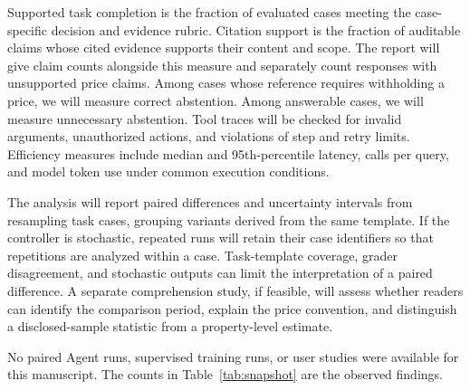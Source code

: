 Supported task completion is the fraction of evaluated cases meeting the case-specific decision and evidence rubric. Citation support is the fraction of auditable claims whose cited evidence supports their content and scope. The report will give claim counts alongside this measure and separately count responses with unsupported price claims. Among cases whose reference requires withholding a price, we will measure correct abstention. Among answerable cases, we will measure unnecessary abstention. Tool traces will be checked for invalid arguments, unauthorized actions, and violations of step and retry limits. Efficiency measures include median and 95th-percentile latency, calls per query, and model token use under common execution conditions.

The analysis will report paired differences and uncertainty intervals from resampling task cases, grouping variants derived from the same template. If the controller is stochastic, repeated runs will retain their case identifiers so that repetitions are analyzed within a case. Task-template coverage, grader disagreement, and stochastic outputs can limit the interpretation of a paired difference. A separate comprehension study, if feasible, will assess whether readers can identify the comparison period, explain the price convention, and distinguish a disclosed-sample statistic from a property-level estimate.


No paired Agent runs, supervised training runs, or user studies were available for this manuscript. The counts in Table~\ref{tab:snapshot} are the observed findings.
